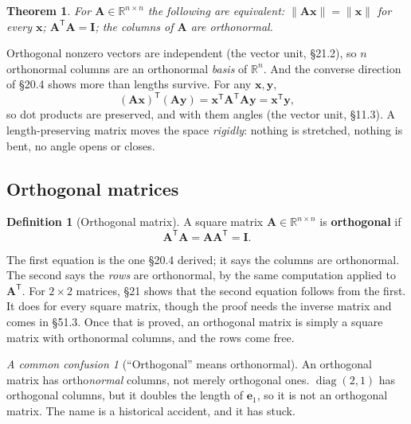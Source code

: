 \documentclass[11pt]{article}
\theoremstyle{plain}
\newtheorem{thm}{Theorem}[section]
\theoremstyle{definition}
\newtheorem{defn}{Definition}[section]
\theoremstyle{remark}
\newtheorem*{warn}{A common confusion}
\newcommand{\R}{\mathbb{R}}
\newcommand{\vc}[1]{\mathbf{#1}}
\newcommand{\mt}[1]{\mathbf{#1}}
\newcommand{\norm}[1]{\lVert #1\rVert}
\newcommand{\T}{^{\mathsf{T}}}
\DeclareMathOperator{\diagop}{diag}
\begin{document}
\begin{thm}
For $\mt{A}\in\R^{n\times n}$ the following are equivalent:
$\norm{\mt{A}\vc{x}}=\norm{\vc{x}}$ for every $\vc{x}$;
$\mt{A}\T\mt{A}=\mt{I}$; the columns of $\mt{A}$ are orthonormal.
\end{thm}

\noindent Orthogonal nonzero vectors are independent (the vector unit, \S21.2),
so $n$ orthonormal columns are an orthonormal \emph{basis} of $\R^{n}$. And
the converse direction of \S20.4 shows more than lengths survive. For any
$\vc{x},\vc{y}$,
\[
  (\mt{A}\vc{x})\T(\mt{A}\vc{y})=\vc{x}\T\mt{A}\T\mt{A}\vc{y}=\vc{x}\T\vc{y},
\]
so dot products are preserved, and with them angles (the vector unit, \S11.3).
A length-preserving matrix moves the space \emph{rigidly}: nothing is stretched,
nothing is bent, no angle opens or closes.

\subsection{Orthogonal matrices}
\begin{defn}[Orthogonal matrix]
A square matrix $\mt{A}\in\R^{n\times n}$ is \textbf{orthogonal} if
\[
  \mt{A}\T\mt{A}=\mt{A}\mt{A}\T=\mt{I} .
\]
\end{defn}

\noindent The first equation is the one \S20.4 derived; it says the columns are
orthonormal. The second says the \emph{rows} are orthonormal, by the same
computation applied to $\mt{A}\T$. For $2\times2$ matrices, \S21 shows that the
second equation follows from the first. It does for every square matrix, though
the proof needs the inverse matrix and comes in \S51.3. Once that is proved, an
orthogonal matrix is simply a square matrix with orthonormal columns, and the
rows come free.

\begin{warn}[``Orthogonal'' means orthonormal]
An orthogonal matrix has ortho\emph{normal} columns, not merely orthogonal
ones. $\diagop(2,1)$ has orthogonal columns, but it doubles the length of
$\vc{e}_1$, so it is not an orthogonal matrix. The name is a historical accident,
and it has stuck.
\end{warn}
\end{document}
